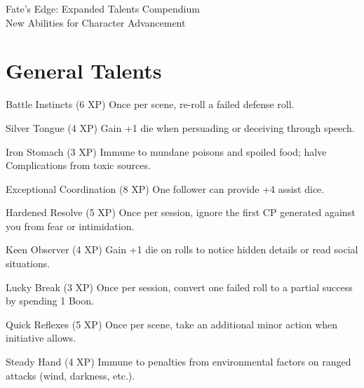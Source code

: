 \documentclass[11pt]{article}
\begin{document}
\begin{center}
{\Huge Fate's Edge: Expanded Talents Compendium}\\
\vspace{0.5cm}
{\large New Abilities for Character Advancement}
\end{center}

\section*{General Talents}

\begin{talentbox}{Battle Instincts (6 XP)}
Once per scene, re-roll a failed defense roll.
\end{talentbox}

\begin{talentbox}{Silver Tongue (4 XP)}
Gain +1 die when persuading or deceiving through speech.
\end{talentbox}

\begin{talentbox}{Iron Stomach (3 XP)}
Immune to mundane poisons and spoiled food; halve Complications from toxic sources.
\end{talentbox}

\begin{talentbox}{Exceptional Coordination (8 XP)}
One follower can provide +4 assist dice.
\end{talentbox}

\begin{talentbox}{Hardened Resolve (5 XP)}
Once per session, ignore the first CP generated against you from fear or intimidation.
\end{talentbox}

\begin{talentbox}{Keen Observer (4 XP)}
Gain +1 die on rolls to notice hidden details or read social situations.
\end{talentbox}

\begin{talentbox}{Lucky Break (3 XP)}
Once per session, convert one failed roll to a partial success by spending 1 Boon.
\end{talentbox}

\begin{talentbox}{Quick Reflexes (5 XP)}
Once per scene, take an additional minor action when initiative allows.
\end{talentbox}

\begin{talentbox}{Steady Hand (4 XP)}
Immune to penalties from environmental factors on ranged attacks (wind, darkness, etc.).
\end{talentbox}
\end{document}
